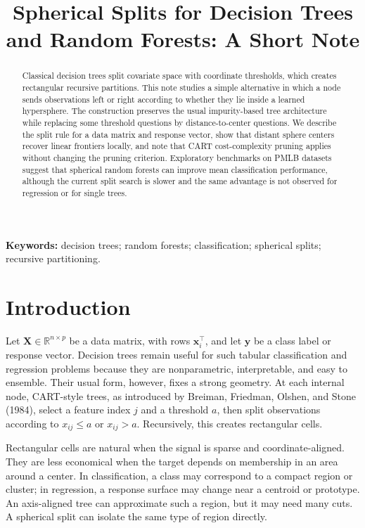 \documentclass[12pt]{article}
\title{Spherical Splits for Decision Trees and Random Forests: A Short Note}
\author{}
\date{}
\begin{document}
\maketitle

\begin{abstract}
Classical decision trees split covariate space with coordinate thresholds,
which creates rectangular recursive partitions. This note studies a simple
alternative in which a node sends observations left or right according to
whether they lie inside a learned hypersphere. The construction preserves the
usual impurity-based tree architecture while replacing some threshold questions
by distance-to-center questions. We describe the split rule for a data matrix
and response vector, show that distant sphere centers recover linear frontiers
locally, and note that CART cost-complexity pruning applies without changing
the pruning criterion. Exploratory benchmarks on PMLB datasets suggest that
spherical random forests can improve mean classification performance, although
the current split search is slower and the same advantage is not observed for
regression or for single trees.
\end{abstract}

\noindent\textbf{Keywords:} decision trees; random forests; classification;
spherical splits; recursive partitioning.

\section{Introduction}

Let $\mathbf{X}\in\mathbb{R}^{n\times p}$ be a data matrix, with rows
$\mathbf{x}_i^\top$, and let $\mathbf{y}$ be a class label or response vector.
Decision trees remain useful for such tabular classification and regression
problems because they are nonparametric, interpretable, and easy to ensemble.
Their usual form, however, fixes a strong geometry. At each internal node,
CART-style trees, as introduced by Breiman, Friedman, Olshen, and Stone (1984),
select a feature index $j$ and a threshold $a$, then split observations
according to $x_{ij}\le a$ or $x_{ij}>a$. Recursively, this creates rectangular
cells.

Rectangular cells are natural when the signal is sparse and coordinate-aligned.
They are less economical when the target depends on membership in an area
around a center. In classification, a class may correspond to a compact region
or cluster; in regression, a response surface may change near a centroid or
prototype. An axis-aligned tree can approximate such a region, but it may need
many cuts. A spherical split can isolate the same type of region directly.
\end{document}
